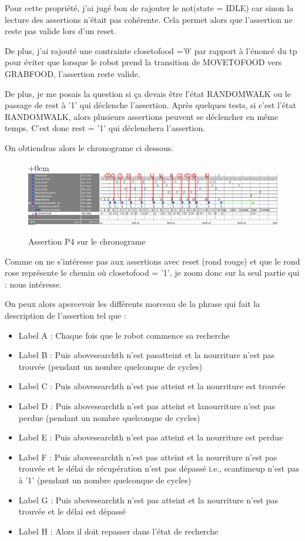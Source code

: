 \documentclass{article}
\newcommand{\alinea}{
\textbf{\hspace{8mm}}
}
\newcommand{\sautligne}{
\textbf{\vspace{5mm}}
}
\begin{document}
Pour cette propriété, j'ai jugé bon de rajouter le not(state = IDLE) car sinon la lecture des assertions n'était pas cohérente. Cela permet alors que l'assertion ne reste pas valide lors d'un reset. 

\alinea 

De plus, j'ai rajouté une contrainte closetofood ='0' par rapport à l'énoncé du tp pour éviter que lorsque le robot prend la transition de MOVETOFOOD vers GRABFOOD, l'assertion reste valide.
\sautligne

De plus, je me posais la question si ça devais être l'état RANDOMWALK ou le passage de rest à '1' qui déclenche l'assertion. Après quelques tests, si c'est l'état RANDOMWALK, alors plusieurs assertions peuvent se déclencher en même temps. C'est donc rest = '1' qui déclenchera l'assertion.

On obtiendras alors le chronograme ci dessous. 

\begin{figure}[!h]
\advance\leftskip+0cm
\includegraphics[scale=0.6]{PSL/P4-1.PNG}
\caption{Assertion P4 sur le chronograme }
\end{figure}

Comme on ne s'intéresse pas aux assertions avec reset (rond rouge) et que le rond rose représente le chemin où closetofood = '1', je zoom donc sur la seul partie qui : nous intéresse.

On peux alors apercevoir les différents morceau de la phrase qui fait la description de l'assertion tel que :
\begin{itemize}
\item Label A : Chaque fois que le robot commence sa recherche
\item Label B : Puis abovesearchth n'est pasatteint et la nourriture n'est pas trouvée (pendant un nombre quelconque de cycles)
\item Label C : Puis abovesearchth n'est pas atteint et la nourriture est trouvée
\item Label D : Puis abovesearchth n'est pas atteint et lanourriture n'est pas perdue (pendant un nombre quelconque de cycles)
\item Label E : Puis abovesearchth n'est pas atteint et la nourriture est perdue
\item Label F : Puis abovesearchth n'est pas atteint et la nourriture n'est pas trouvée et le délai de récupération n'est pas dépassé i.e., scantimeup n'est pas à '1' (pendant un
nombre quelconque de cycles)

\item Label G :  Puis abovesearchth n'est pas atteint et la nourriture n'est pas trouvée
et le délai est dépassé 

\item Label H : Alors il doit repasser dans l'état de recherche


\end{itemize}
\end{document}
